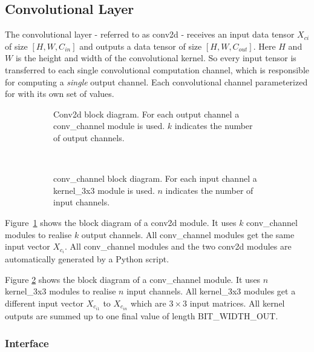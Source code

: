 \subsection{Convolutional Layer}

The convolutional layer - referred to as conv2d - receives an input data tensor $X_{ci} $ of size $[H, W, C_{in}]$ and outputs a data tensor of size $[H,W,C_{out}]$. Here $H$ and $W$ is the height and width of the convolutional kernel. So every input tensor is transferred to each single convolutional computation channel, which is responsible for computing a \emph{single} output channel. Each convolutional channel parameterized for with its own set of values.

\begin{figure}[h]
	\centering
	\begin{subfigure}[t]{0.5\textwidth}
		\centering
		
		\caption[Conv2d block diagram.]{Conv2d block diagram. For each output channel a conv\_channel module is used. $k$ indicates the number of output channels.}
		\label{fig:conv2d}
	\end{subfigure}%
	~
	\begin{subfigure}[t]{0.5\textwidth}
		\centering
		
		\caption[conv\_channel block diagram.]{conv\_channel block diagram. For each input channel a kernel\_3x3 module is used. $n$ indicates the number of input channels.}
		\label{fig:conv-channel}		
	\end{subfigure}
	\caption{}
	\label{fig:hw-layer-conv}
\end{figure}


Figure~\ref{fig:conv2d} shows the block diagram of a conv2d module. It uses $k$ conv\_channel modules to realise $k$ output channels. All conv\_channel modules get the same input vector $X_{c_i}$. All conv\_channel modules and the two conv2d modules are automatically generated by a Python script.

Figure \ref{fig:conv-channel} shows the block diagram of a conv\_channel module. It uses $n$ kernel\_3x3 modules to realise $n$ input channels. All kernel\_3x3 modules get a different input vector $X_{c_{i1}}$ to $X_{c_{in}}$ which are $3 \times 3$ input matrices. All kernel outputs are summed up to one final value of length BIT\_WIDTH\_OUT.

\subsubsection{Interface}

